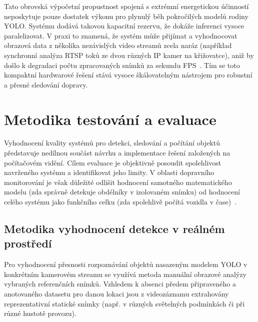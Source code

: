\documentclass[male,czech,api_bc]{kitheses}
\begin{document}
Tato obrovská výpočetní propustnost spojená s extrémní energetickou účinností neposkytuje pouze dostatek výkonu pro plynulý běh pokročilých modelů rodiny YOLO. Systému dodává takovou kapacitní rezervu, že dokáže inferenci vysoce paralelizovat. V praxi to znamená, že systém může přijímat a vyhodnocovat obrazová data z několika nezávislých video streamů zcela naráz (například synchronní analýza \acs{RTSP} toků ze dvou různých IP kamer na křižovatce), aniž by došlo k degradaci počtu zpracovaných snímků za sekundu \acs{FPS}~\cite{hailo_alpr_2024, hailo_architecture_2026}. Tím se toto kompaktní hardwarové řešení stává vysoce škálovatelným nástrojem pro robustní a přesné sledování dopravy.

\section{Metodika testování a evaluace}
Vyhodnocení kvality systémů pro detekci, sledování a počítání objektů představuje nedílnou součást návrhu a implementace řešení založených na počítačovém vidění. Cílem evaluace je objektivně posoudit spolehlivost navrženého systému a identifikovat jeho limity. V oblasti dopravního monitorování je však důležité odlišit hodnocení samotného matematického modelu (zda správně detekuje obdélníky v izolovaném snímku) od hodnocení celého systému jako funkčního celku (zda spolehlivě počítá vozidla v čase)~\cite{szeliski_computer_vision, zhou_traffic_survey_2024}.

\subsection{Metodika vyhodnocení detekce v reálném prostředí}
Pro vyhodnocení přesnosti rozpoznávání objektů nasazeným modelem YOLO v konkrétním kamerovém streamu se využívá metoda manuální obrazové analýzy vybraných referenčních snímků. Vzhledem k absenci předem připraveného a anotovaného datasetu pro danou lokaci jsou z videozáznamu extrahovány reprezentativní statické snímky (např. v různých světelných podmínkách či při různé hustotě provozu).
\end{document}
